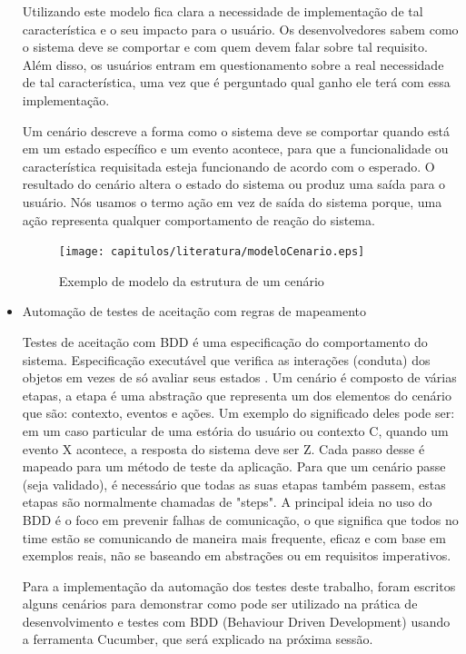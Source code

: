 \begin{itemize}
Utilizando este modelo fica clara a necessidade de implementação de tal característica e o seu impacto para o usuário. Os desenvolvedores sabem como o sistema deve se comportar e com quem devem falar sobre tal requisito. Além disso, os usuários entram em questionamento sobre a real necessidade de tal característica, uma vez que é perguntado qual ganho ele terá com essa implementação.

Um cenário descreve a forma como o sistema  deve se comportar quando está em um estado específico e um evento acontece, para que a funcionalidade ou característica requisitada esteja funcionando de acordo com o esperado.  O resultado do cenário altera o estado do sistema ou produz uma saída para o usuário. Nós usamos o termo ação em vez de saída do sistema \cite{Solis2011} porque, uma ação representa qualquer comportamento de reação do sistema.	

\begin{figure}[H]
	\centering
	\captionsetup{justification=centering,margin=2cm}
	\texttt{[image: capitulos/literatura/modeloCenario.eps]}
	\caption{Exemplo de modelo da estrutura de um cenário}
	\label{fig:iceCreamConAntiPattern}
\end{figure}	
	
	\item Automação de testes de aceitação com regras de mapeamento

Testes de aceitação com BDD é uma especificação do comportamento do sistema. Especificação executável que verifica as interações (conduta) dos objetos em vezes de só avaliar seus estados \cite{bddIntroducing}. Um cenário é composto de várias etapas, a etapa é uma abstração que representa um dos elementos do cenário que são: contexto, eventos e ações. Um exemplo do significado deles pode ser: em um caso particular de uma estória do usuário ou contexto C, quando um evento X acontece, a resposta do sistema deve ser Z. Cada passo desse é mapeado para um método de teste da aplicação. Para que um cenário passe (seja validado), é necessário que todas as suas etapas também passem, estas etapas são normalmente chamadas de "steps". A principal ideia no uso do BDD é o foco em prevenir falhas de comunicação, o que significa que todos no time estão se comunicando de maneira mais frequente, eficaz e com base em exemplos reais, não se baseando em abstrações ou em requisitos imperativos. 

Para a implementação da automação dos testes deste trabalho, foram escritos alguns cenários para demonstrar como pode ser utilizado na prática de desenvolvimento e testes com BDD (Behaviour Driven Development) usando a ferramenta Cucumber, que será explicado na próxima sessão.
\end{itemize}

